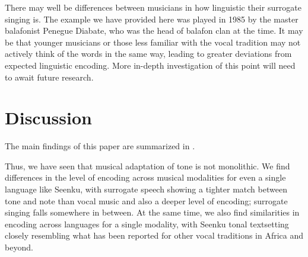 \documentclass[output=paper]{langscibook}
\begin{document}
There may well be differences between musicians in how linguistic their surrogate singing is. The example we have provided here was played in 1985 by the master balafonist Penegue Diabate, who was the head of balafon clan at the time. It may be that younger musicians or those less familiar with the vocal tradition may not actively think of the words in the same way, leading to greater deviations from expected linguistic encoding. More in-depth investigation of this point will need to await future research. 


\section{Discussion}\label{sec-discussion}

The main findings of this paper are summarized in .

\begin{table}
\caption{Main findings for musical adaptation of tone\label{tab:mcpherson:Mainfindings}}
\end{table}

Thus, we have seen that musical adaptation of tone is not monolithic. We find differences in the level of encoding across musical modalities for even a single language like Seenku, with surrogate speech showing a tighter match between tone and note than vocal music and also a deeper level of encoding; surrogate singing falls somewhere in between. At the same time, we also find similarities in encoding across languages for a single modality, with Seenku tonal textsetting closely resembling what has been reported for other vocal traditions in Africa and beyond. 
\end{document}
